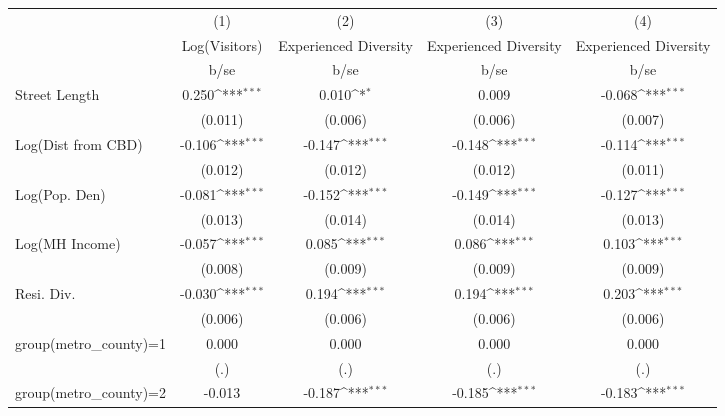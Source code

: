 {
\def\sym#1{\ifmmode^{#1}\else\(^{#1}\)\fi}
\begin{tabular}{l*{4}{c}}
\toprule
                    &\multicolumn{1}{c}{(1)}&\multicolumn{1}{c}{(2)}&\multicolumn{1}{c}{(3)}&\multicolumn{1}{c}{(4)}\\
                    &\multicolumn{1}{c}{Log(Visitors)}&\multicolumn{1}{c}{Experienced Diversity}&\multicolumn{1}{c}{Experienced Diversity}&\multicolumn{1}{c}{Experienced Diversity}\\
                    &        b/se         &        b/se         &        b/se         &        b/se         \\
\midrule
Street Length       &       0.250\sym{***}&       0.010\sym{*}  &       0.009         &      -0.068\sym{***}\\
                    &     (0.011)         &     (0.006)         &     (0.006)         &     (0.007)         \\
Log(Dist from CBD)  &      -0.106\sym{***}&      -0.147\sym{***}&      -0.148\sym{***}&      -0.114\sym{***}\\
                    &     (0.012)         &     (0.012)         &     (0.012)         &     (0.011)         \\
Log(Pop. Den)       &      -0.081\sym{***}&      -0.152\sym{***}&      -0.149\sym{***}&      -0.127\sym{***}\\
                    &     (0.013)         &     (0.014)         &     (0.014)         &     (0.013)         \\
Log(MH Income)      &      -0.057\sym{***}&       0.085\sym{***}&       0.086\sym{***}&       0.103\sym{***}\\
                    &     (0.008)         &     (0.009)         &     (0.009)         &     (0.009)         \\
Resi. Div.          &      -0.030\sym{***}&       0.194\sym{***}&       0.194\sym{***}&       0.203\sym{***}\\
                    &     (0.006)         &     (0.006)         &     (0.006)         &     (0.006)         \\
group(metro\_county)=1&       0.000         &       0.000         &       0.000         &       0.000         \\
                    &         (.)         &         (.)         &         (.)         &         (.)         \\
group(metro\_county)=2&      -0.013         &      -0.187\sym{***}&      -0.185\sym{***}&      -0.183\sym{***}\\

\end{tabular}}
